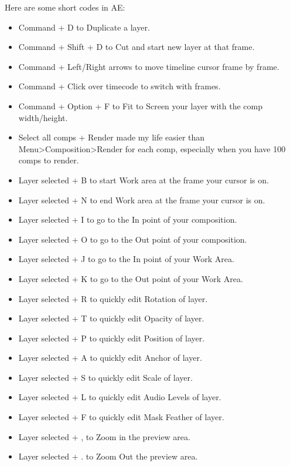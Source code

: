 \begin{fullwidth}
Here are some short codes in AE:

\begin{itemize}
\item Command + D to Duplicate a layer.
\item Command + Shift + D to Cut and start new layer at that frame.
\item Command + Left/Right arrows to move timeline cursor frame by frame.
\item Command + Click over timecode to switch with frames.
\item Command + Option + F to Fit to Screen your layer with the comp width/height.
\item Select all comps + Render made my life easier than Menu>Composition>Render for each comp, especially when you have 100 comps to render.
\item Layer selected + B to start Work area at the frame your cursor is on.
\item Layer selected + N to end Work area at the frame your cursor is on.
\item Layer selected + I to go to the In point of your composition.
\item Layer selected + O to go to the Out point of your composition.
\item Layer selected + J to go to the In point of your Work Area.
\item Layer selected + K to go to the Out point of your Work Area.
\item Layer selected + R to quickly edit Rotation of layer.
\item Layer selected + T to quickly edit Opacity of layer.
\item Layer selected + P to quickly edit Position of layer.
\item Layer selected + A to quickly edit Anchor of layer.
\item Layer selected + S to quickly edit Scale of layer.
\item Layer selected + L to quickly edit Audio Levels of layer.
\item Layer selected + F to quickly edit Mask Feather of layer.
\item Layer selected + , to Zoom in the preview area.
\item Layer selected + . to Zoom Out the preview area.
\end{itemize}

\clearpage
\end{fullwidth}
